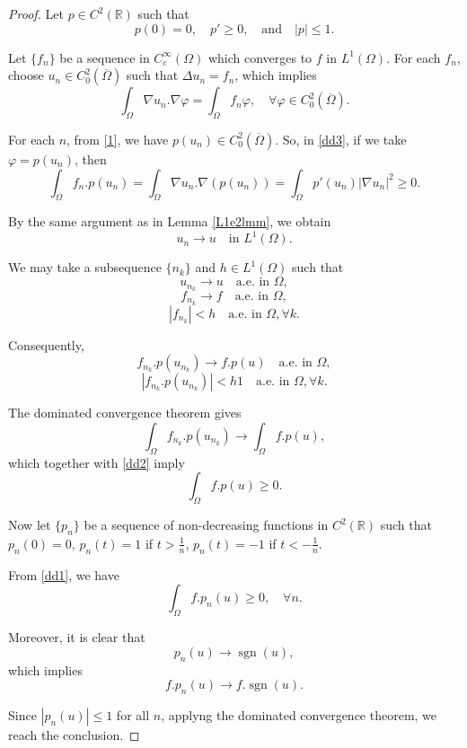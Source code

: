 \documentclass[a4paper, 11pt]{report}
\theoremstyle{definition}\newtheorem*{rmk}{Remark}
\DeclareMathOperator{\sgn}{sgn}
\begin{document}
\begin{proof}
\mbox{}

Let $p\in C^2(\mathbb{R})$ such that 
\begin{equation}\label{1}
p(0)=0,\quad p' \ge 0,\quad\text{and}\quad |p|\le 1 .
\end{equation}

Let $\{f_n\}$ be a sequence in $C^{\infty}_c(\Omega)$ which converges to $f$ in $L^1(\Omega)$. For each $f_n$, choose $u_n \in C^2_0(\overline{\Omega})$ such that $\Delta u_n = f_n$,
which implies
\begin{equation}\label{dd3}
\int_{\Omega}\nabla u_n.\nabla \varphi = \int_{\Omega} f_n \varphi ,\quad \forall \varphi \in C^2_0(\overline{\Omega}).
\end{equation}

For each $n$, from \eqref{1}, we have $p(u_n)\in C^2_0(\overline{\Omega})$. So, in \eqref{dd3}, if we take $\varphi = p(u_n)$, then
\begin{equation}\label{dd2}
\int_{\Omega} f_n.p(u_n) = \int_{\Omega} \nabla u_n.\nabla(p(u_n)) = \int_{\Omega} p'(u_n)|\nabla u_n|^2 \ge 0.
\end{equation}

By the same argument as in Lemma \ref{L1e2lmm}, we obtain
\[
u_n \to u \quad \text{in }L^1(\Omega).
\]

We may take a subsequence $\{n_k \}$ and $h \in L^1(\Omega)$ such that
\[
u_{n_k} \to u \quad \text{a.e.\ in }\Omega,
\]
\[
f_{n_k} \to f \quad \text{a.e.\ in }\Omega,
\]
\[
|f_{n_k}| < h \quad \text{a.e.\ in } \Omega,\forall k.
\]

Consequently,
\[
f_{n_k}.p(u_{n_k}) \to f.p (u)\quad \text{a.e.\ in } \Omega,
\]
\[
|f_{n_k}.p(u_{n_k})| < h1 \quad \text{a.e.\ in } \Omega,\forall k.
\]

The dominated convergence theorem gives
\[
\int_{\Omega} f_{n_k}.p(u_{n_k}) \to \int_{\Omega} f.p(u),
\]
which together with \eqref{dd2} imply
\begin{equation}\label{dd1}
\int_{\Omega} f.p(u) \ge 0.
\end{equation}

Now let $\{p_n\}$ be a sequence of non-decreasing functions in $C^2(\mathbb{R})$ such that $p_n(0) = 0$, $p_n(t) = 1$ if $t > \frac{1}{n}$, $p_n(t) = -1$ if $t < -\frac{1}{n}$.

From \eqref{dd1}, we have
\[
\int_{\Omega} f.p_n(u) \ge 0, \quad \forall n.
\]

Moreover, it is clear that
\[
p_n(u)\to \sgn(u),
\]
which implies
\[
f.p_n(u)\to f.\sgn(u).
\]

Since $|p_n(u)|\le 1$ for all $n$, applyng the dominated convergence theorem, we reach the conclusion.
\end{proof}
\end{document}
